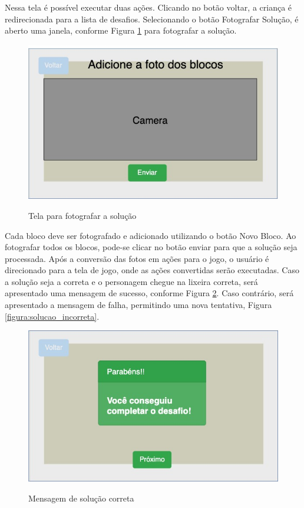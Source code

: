     Nessa tela é possível executar duas ações.
    Clicando no botão voltar, a criança é redirecionada para a lista de desafios.
    Selecionando o botão Fotografar Solução, é aberto uma janela, conforme Figura \ref{figura:fotografar_blocos} para fotografar a solução.
    
    \begin{figure}[H]
        \caption{Tela para fotografar a solução}
        \centering
        \includegraphics[width=\linewidth]{Imagens/Cap3/UploadSolucao.jpg}
        \label{figura:fotografar_blocos}
    \end{figure}
    
    Cada bloco deve ser fotografado e adicionado utilizando o botão Novo Bloco.
    Ao fotografar todos os blocos, pode-se clicar no botão enviar para que a solução seja processada.
    Após a conversão das fotos em ações para o jogo, o usuário é direcionado para a tela de jogo, onde as ações convertidas serão executadas.
    Caso a solução seja a correta e o personagem chegue na lixeira correta, será apresentado uma mensagem de sucesso, conforme Figura \ref{figura:solucao_correta}. Caso contrário, será apresentado a mensagem de falha, permitindo uma nova tentativa, Figura \ref{figura:solucao_incorreta}.
    
    \begin{figure}[H]
        \caption{Mensagem de solução correta}
        \centering
        \includegraphics[width=\linewidth]{Imagens/Cap3/solucao_correta.jpg}
        \label{figura:solucao_correta}
    \end{figure}
    
